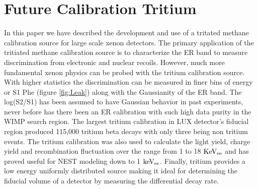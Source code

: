 \section{Future Calibration Tritium}

In this paper we have described the development and use of a tritated methane calibration source for large scale xenon detectors. The primary application of the tritiated methane calibration source is to characterize the ER band to measure discrimination from electronic and nuclear recoils. However, much more fundamental xenon physics can be probed with the tritium calibration source. With higher statistics the discrimination can be measured in finer bins of energy or S1 Phe (figure \ref{fig:Leak}) along with the Gaussianity of the ER band. The log(S2/S1) has been assumed to have Gaussian behavior in past experiments, never before has there been an ER calibration with such high data purity in the WIMP search region. The largest tritium calibration in LUX detector's fiducial region produced 115,000 tritium beta decays with only three being non tritium events. The tritium calibration was also used to calculate the light yield, charge yield and recombination fluctuation over the range from 1 to 18 $\rm KeV_{ee}$ and has proved useful for NEST modeling down to 1 $\rm keV_{ee}$. Finally, tritium provides a low energy uniformly distributed source making it ideal for determining the fiducial volume of a detector by measuring the differential decay rate.



